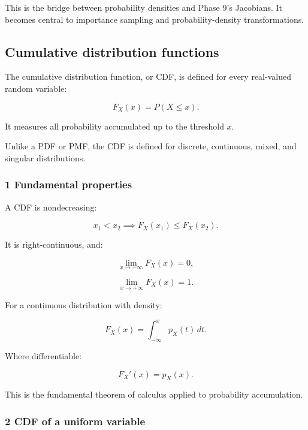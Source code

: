This is the bridge between probability densities and Phase 9's Jacobians. It becomes central to importance sampling and probability-density transformations.

\subsection{Cumulative distribution functions}\label{02-foundations-ii-ch023-cumulative-distribution-functions}

\hypertarget{02-foundations-ii-ch023-cumulative-distribution-functions}{}

The cumulative distribution function, or CDF, is defined for every real-valued random variable:

\[
 \boxed{ F_X(x)=P(X\le x) }.
\]

It measures all probability accumulated up to the threshold \(x\).

Unlike a PDF or PMF, the CDF is defined for discrete, continuous, mixed, and singular distributions.

\subsubsection{1 Fundamental properties}\label{02-foundations-ii-ch023-fundamental-properties}

\hypertarget{02-foundations-ii-ch023-fundamental-properties}{}

A CDF is nondecreasing:

\[
 x_1<x_2 \implies F_X(x_1)\le F_X(x_2).
\]

It is right-continuous, and:

\[
 \lim_{x\to-\infty}F_X(x)=0,
\]

\[
 \lim_{x\to+\infty}F_X(x)=1.
\]

For a continuous distribution with density:

\[
 \boxed{ F_X(x)=\int_{-\infty}^{x}p_X(t)\,dt }.
\]

Where differentiable:

\[
 \boxed{ F_X'(x)=p_X(x) }.
\]

This is the fundamental theorem of calculus applied to probability accumulation.

\subsubsection{2 CDF of a uniform variable}\label{02-foundations-ii-ch023-cdf-of-a-uniform-variable}

